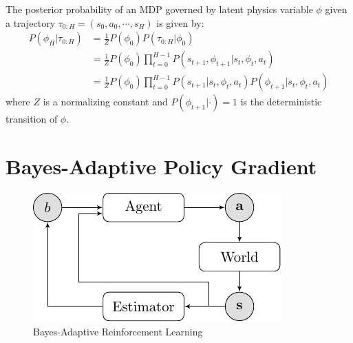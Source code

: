 \documentclass{article}
\DeclareMathOperator*{\argmax}{arg\,max}
\begin{document}

The posterior probability of an MDP governed by latent physics variable $\phi$ given a trajectory $\tau_{0:H} = (s_0, a_0, \cdots, s_H)$ is given by:
\begin{align}
P(\phi_H | \tau_{0:H})
  &= \frac{1}{Z} P(\phi_0) P(\tau_{0:H} | \phi_0) \nonumber \\
  &= \frac{1}{Z} P(\phi_0) \prod_{t=0}^{H-1} P(s_{t+1}, \phi_{t+1} | s_t, \phi_t, a_t) \nonumber \\
  &= \frac{1}{Z} P(\phi_0) \prod_{t=0}^{H-1} P(s_{t+1}|s_t, \phi_t, a_t) P(\phi_{t+1} | s_t, \phi_t, a_t)
\end{align}
where $Z$ is a normalizing constant and $P(\phi_{t+1} | \cdot) = 1$ is the deterministic transition of $\phi$.


\section{Bayes-Adaptive Policy Gradient}

\begin{figure}[t!]
\centering
\includegraphics[width=0.5\linewidth]{figs/system_structure.pdf}
\caption{Bayes-Adaptive Reinforcement Learning}
\end{figure}
\end{document}
